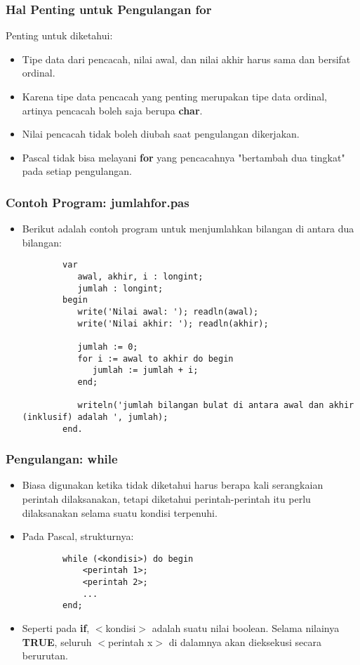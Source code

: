 \documentclass{beamer}
\begin{document}
\begin{frame}
\frametitle{Hal Penting untuk Pengulangan for}
Penting untuk diketahui:
\begin{itemize}
    \item Tipe data dari pencacah, nilai awal, dan nilai akhir harus sama dan bersifat \alert{ordinal}.
    \item Karena tipe data pencacah yang penting merupakan tipe data ordinal, artinya pencacah boleh saja berupa \textbf{char}.
    \item Nilai pencacah tidak boleh diubah saat pengulangan dikerjakan.
    \item Pascal tidak bisa melayani \textbf{for} yang pencacahnya "bertambah dua tingkat" pada setiap pengulangan.
\end{itemize}
\end{frame}

\begin{frame}[fragile]
\frametitle{Contoh Program: jumlahfor.pas}
\begin{itemize}
    \item Berikut adalah contoh program untuk menjumlahkan bilangan di antara dua bilangan:
    \begin{lstlisting}
        var
           awal, akhir, i : longint;
           jumlah : longint;
        begin
           write('Nilai awal: '); readln(awal);
           write('Nilai akhir: '); readln(akhir);

           jumlah := 0;
           for i := awal to akhir do begin
              jumlah := jumlah + i;
           end;

           writeln('jumlah bilangan bulat di antara awal dan akhir (inklusif) adalah ', jumlah);
        end.
    \end{lstlisting}
\end{itemize}
\end{frame}

\begin{frame}[fragile]
\frametitle{Pengulangan: while}
\begin{itemize}
    \item Biasa digunakan ketika tidak diketahui harus berapa kali serangkaian perintah dilaksanakan, tetapi diketahui perintah-perintah itu perlu dilaksanakan selama suatu kondisi terpenuhi.
    \item Pada Pascal, strukturnya:
    \begin{lstlisting}
        while (<kondisi>) do begin
            <perintah 1>;
            <perintah 2>;
            ...
        end;
    \end{lstlisting}
    \item Seperti pada \textbf{if}, $<$kondisi$>$ adalah suatu nilai boolean. Selama nilainya \textbf{TRUE}, seluruh $<$perintah x$>$ di dalamnya akan dieksekusi secara berurutan.
\end{itemize}
\end{frame}
\end{document}
